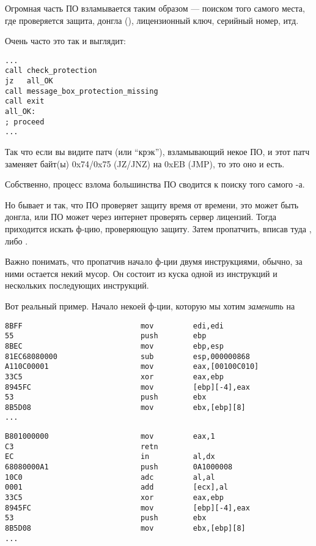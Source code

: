 \label{\SoftwareCracking}

Огромная часть ПО взламывается таким образом --- поиском того самого места, где проверяется защита, донгла (),
лицензионный ключ, серийный номер, итд.

Очень часто это так и выглядит:

\begin{lstlisting}[style=customasmx86]
...
call check_protection
jz   all_OK
call message_box_protection_missing
call exit
all_OK:
; proceed
...
\end{lstlisting}

Так что если вы видите патч (или ``крэк''), взламывающий некое ПО,
и этот патч заменяет байт(ы) 0x74/0x75 (JZ/JNZ) на 0xEB (JMP), то это оно и есть.

Собственно, процесс взлома большинства ПО сводится к поиску того самого -а.

\myhrule{}

Но бывает и так, что ПО проверяет защиту время от времени, это может быть донгла,
или ПО может через интернет проверять сервер лицензий.
Тогда приходится искать ф-цию, проверяющую защиту.
Затем пропатчить, вписав туда , либо .

Важно понимать, что пропатчив начало ф-ции двумя инструкциями, обычно, за ними остается некий мусор.
Он состоит из куска одной из инструкций и нескольких последующих инструкций.

Вот реальный пример.
Начало некоей ф-ции, которую мы хотим \emph{заменить} на 

\begin{lstlisting}[style=customasmx86,caption=Было]
8BFF                           mov         edi,edi
55                             push        ebp
8BEC                           mov         ebp,esp
81EC68080000                   sub         esp,000000868
A110C00001                     mov         eax,[00100C010]
33C5                           xor         eax,ebp
8945FC                         mov         [ebp][-4],eax
53                             push        ebx
8B5D08                         mov         ebx,[ebp][8]
...
\end{lstlisting}

\begin{lstlisting}[style=customasmx86,caption=Стало]
B801000000                     mov         eax,1
C3                             retn
EC                             in          al,dx
68080000A1                     push        0A1000008
10C0                           adc         al,al
0001                           add         [ecx],al
33C5                           xor         eax,ebp
8945FC                         mov         [ebp][-4],eax
53                             push        ebx
8B5D08                         mov         ebx,[ebp][8]
...
\end{lstlisting}

